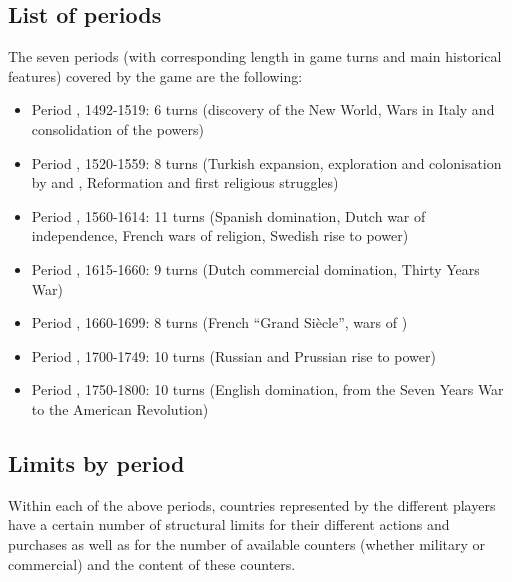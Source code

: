 \subsection{List of periods}

The seven periods (with corresponding length in game turns and main historical
features) covered by the game are the following:
\begin{itemize}
\item Period , 1492-1519: 6 turns (discovery of the New World, Wars
  in Italy and consolidation of the powers)%
\item Period , 1520-1559: 8 turns (Turkish expansion, exploration
  and colonisation by \SPA and \POR, Reformation and first religious
  struggles) %
\item Period , 1560-1614: 11 turns (Spanish domination, Dutch war
  of independence, French wars of religion, Swedish rise to
  power) %
\item Period , 1615-1660: 9 turns (Dutch commercial domination,
  Thirty Years War)%
\item Period , 1660-1699: 8 turns (French ``Grand Si\`{e}cle'', wars
  of )%
\item Period , 1700-1749: 10 turns (Russian and Prussian rise to
  power)%
\item Period , 1750-1800: 10 turns (English domination, from the
  Seven Years War to the American Revolution)%
\end{itemize}



\subsection{Limits by period}

\label{chThePowers:Limits}
\aparag Within each of the above periods, countries represented by the
different players have a certain number of structural limits for their
different actions and purchases as well as for the number of available
counters (whether military or commercial) and the content of these counters.

